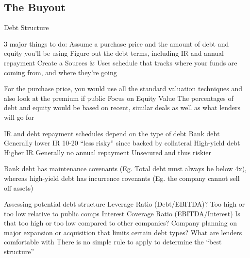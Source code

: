 \documentclass[10pt]{article}
\begin{document}
  \subsection{The Buyout}

    \begin{core}{Debt Structure}

      3 major things to do:
      Assume a purchase price and the amount of debt and equity you’ll be using
      Figure out the debt terms, including IR and annual repayment
      Create a Sources & Uses schedule that tracks where your funds are coming from, and where they’re going

      For the purchase price, you would use all the standard valuation techniques and also look at the premium if public
      Focus on Equity Value
      The percentages of debt and equity would be based on recent, similar deals as well as what lenders will go for

      IR and debt repayment schedules depend on the type of debt
      Bank debt
      Generally lower IR
      10-20%
      “less risky” since backed by collateral
      High-yield debt
      Higher IR
      Generally no annual repayment
      Unsecured and thus riskier

      Bank debt has maintenance covenants (Eg. Total debt must always be below 4x), whereas high-yield debt has incurrence covenants (Eg. the company cannot sell off assets)

      Assessing potential debt structure
      Leverage Ratio (Debt/EBITDA)? Too high or too low relative to public comps
      Interest Coverage Ratio (EBITDA/Interest) Is that too high or too low compared to other companies?
      Company planning on major expansion or acquisition that limits certain debt types?
      What are lenders comfortable with
      There is no simple rule to apply to determine the “best structure”

    \end{core}
\end{document}
